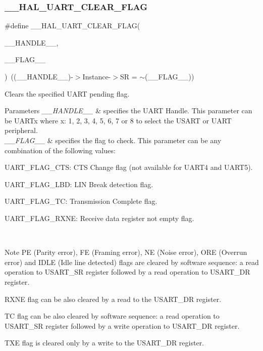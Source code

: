 \subsubsection{\texorpdfstring{\+\_\+\+\_\+\+H\+A\+L\+\_\+\+U\+A\+R\+T\+\_\+\+C\+L\+E\+A\+R\+\_\+\+F\+L\+AG}{\_\_HAL\_UART\_CLEAR\_FLAG}}
{\footnotesize\ttfamily \#define \+\_\+\+\_\+\+H\+A\+L\+\_\+\+U\+A\+R\+T\+\_\+\+C\+L\+E\+A\+R\+\_\+\+F\+L\+AG(\begin{DoxyParamCaption}\item[{}]{\+\_\+\+\_\+\+H\+A\+N\+D\+L\+E\+\_\+\+\_\+,  }\item[{}]{\+\_\+\+\_\+\+F\+L\+A\+G\+\_\+\+\_\+ }\end{DoxyParamCaption})~((\+\_\+\+\_\+\+H\+A\+N\+D\+L\+E\+\_\+\+\_\+)-\/$>$Instance-\/$>$SR = $\sim$(\+\_\+\+\_\+\+F\+L\+A\+G\+\_\+\+\_\+))}



Clears the specified U\+A\+RT pending flag. 


\begin{DoxyParams}{Parameters}
{\em \+\_\+\+\_\+\+H\+A\+N\+D\+L\+E\+\_\+\+\_\+} & specifies the U\+A\+RT Handle. This parameter can be U\+A\+R\+Tx where x\+: 1, 2, 3, 4, 5, 6, 7 or 8 to select the U\+S\+A\+RT or U\+A\+RT peripheral. \\
\hline
{\em \+\_\+\+\_\+\+F\+L\+A\+G\+\_\+\+\_\+} & specifies the flag to check. This parameter can be any combination of the following values\+: \begin{DoxyItemize}
\item U\+A\+R\+T\+\_\+\+F\+L\+A\+G\+\_\+\+C\+TS\+: C\+TS Change flag (not available for U\+A\+R\+T4 and U\+A\+R\+T5). \item U\+A\+R\+T\+\_\+\+F\+L\+A\+G\+\_\+\+L\+BD\+: L\+IN Break detection flag. \item U\+A\+R\+T\+\_\+\+F\+L\+A\+G\+\_\+\+TC\+: Transmission Complete flag. \item U\+A\+R\+T\+\_\+\+F\+L\+A\+G\+\_\+\+R\+X\+NE\+: Receive data register not empty flag.\end{DoxyItemize}
\\
\hline
\end{DoxyParams}
\begin{DoxyNote}{Note}
PE (Parity error), FE (Framing error), NE (Noise error), O\+RE (Overrun error) and I\+D\+LE (Idle line detected) flags are cleared by software sequence\+: a read operation to U\+S\+A\+R\+T\+\_\+\+SR register followed by a read operation to U\+S\+A\+R\+T\+\_\+\+DR register. 

R\+X\+NE flag can be also cleared by a read to the U\+S\+A\+R\+T\+\_\+\+DR register. 

TC flag can be also cleared by software sequence\+: a read operation to U\+S\+A\+R\+T\+\_\+\+SR register followed by a write operation to U\+S\+A\+R\+T\+\_\+\+DR register. 

T\+XE flag is cleared only by a write to the U\+S\+A\+R\+T\+\_\+\+DR register.
\end{DoxyNote}

